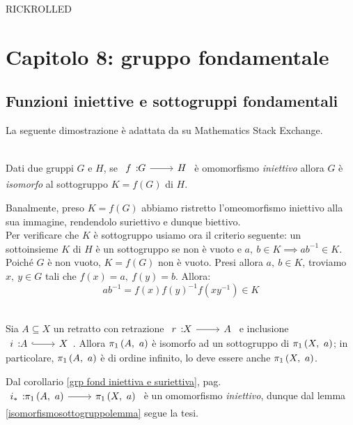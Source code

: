 RICKROLLED

\section{Capitolo 8: gruppo fondamentale}
\subsection{Funzioni iniettive e sottogruppi fondamentali}
La seguente dimostrazione è adattata da \cite{HagenVonEitzen:injectivesubgroup} su Mathematics Stack Exchange.
\begin{lemming}~{}\label{isomorfismosottogruppolemma}\\
Dati due gruppi $G$ e $H$, se $\funz{f}{G}{H}$ è omomorfismo \textit{iniettivo} allora $G$ è \textit{isomorfo} al sottogruppo $K=f\left(G\right)$ di $H$.
\end{lemming}
\begin{demonstration}
	Banalmente, preso $K=f\left(G\right)$ abbiamo ristretto l'omeomorfismo iniettivo alla sua immagine, rendendolo suriettivo e dunque biettivo.\\
	Per verificare che $K$ è sottogruppo usiamo ora il criterio seguente: un sottoinsieme $K$ di $H$ è un sottogruppo se non è vuoto e $a,\ b\in K\implies ab^{-1}\in K$. Poiché $G$ è non vuoto, $K=f\left(G\right)$ non è vuoto. Presi allora $a,\ b\in K$, troviamo $x,\ y\in G$ tali che $f\left(x\right)=a,\ f\left(y\right)=b$. Allora:
	\begin{equation*}
		ab^{-1}=f\left(x\right)f\left(y\right)^{-1}f\left(xy^{-1}\right)\in K
	\end{equation*}
\vspace{-6mm}
\end{demonstration}
\begin{corollary}~{}\\
	Sia $A\subseteq X$ un retratto con retrazione $\funz{r}{X}{A}$ e inclusione $\incl{i}{A}{X}$. Allora $\gruf{A}{a}$ è isomorfo ad un sottogruppo di $\gruf{X}{a}$; in particolare, $\gruf{A}{a}$ è di ordine infinito, lo deve essere anche $\gruf{X}{a}$.
\end{corollary}
\begin{demonstration}
	Dal corollario \ref{grp fond iniettiva e suriettiva}, pag. \pageref{grp fond iniettiva e suriettiva} $\funz{i_{\ast}}{\gruf{A}{a}}{\gruf{X}{a}}$ è un omomorfismo \textit{iniettivo}, dunque dal lemma \ref{isomorfismosottogruppolemma} segue la tesi.
\end{demonstration}
